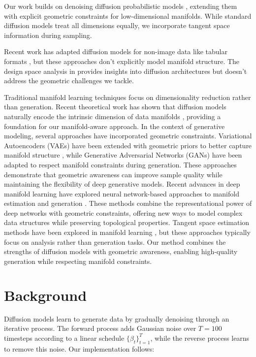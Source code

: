\documentclass[final]{iclr2024_conference}
\begin{document}
Our work builds on denoising diffusion probabilistic models \citep{ddpm,pmlr-v37-sohl-dickstein15}, extending them with explicit geometric constraints for low-dimensional manifolds. While standard diffusion models treat all dimensions equally, we incorporate tangent space information during sampling.

Recent work has adapted diffusion models for non-image data like tabular formats \citep{kotelnikov2022tabddpm}, but these approaches don't explicitly model manifold structure. The design space analysis in \citep{edm} provides insights into diffusion architectures but doesn't address the geometric challenges we tackle.

Traditional manifold learning techniques \citep{goodfellow2016deep,Maaten2008VisualizingDU} focus on dimensionality reduction rather than generation. Recent theoretical work has shown that diffusion models naturally encode the intrinsic dimension of data manifolds \citep{Stanczuk2024DiffusionME}, providing a foundation for our manifold-aware approach. In the context of generative modeling, several approaches have incorporated geometric constraints. Variational Autoencoders (VAEs) have been extended with geometric priors to better capture manifold structure \citep{Kalatzis2020VariationalAW}, while Generative Adversarial Networks (GANs) have been adapted to respect manifold constraints during generation. These approaches demonstrate that geometric awareness can improve sample quality while maintaining the flexibility of deep generative models. Recent advances in deep manifold learning have explored neural network-based approaches to manifold estimation and generation \citep{Magai2023DeepNN}. These methods combine the representational power of deep networks with geometric constraints, offering new ways to model complex data structures while preserving topological properties. Tangent space estimation methods have been explored in manifold learning \citep{Tyagi2012TangentSE}, but these approaches typically focus on analysis rather than generation tasks. Our method combines the strengths of diffusion models with geometric awareness, enabling high-quality generation while respecting manifold constraints.

\section{Background}
\label{sec:background}

Diffusion models \citep{ddpm,pmlr-v37-sohl-dickstein15} learn to generate data by gradually denoising through an iterative process. The forward process adds Gaussian noise over $T=100$ timesteps according to a linear schedule $\{\beta_t\}_{t=1}^T$, while the reverse process learns to remove this noise. Our implementation follows:
\end{document}
